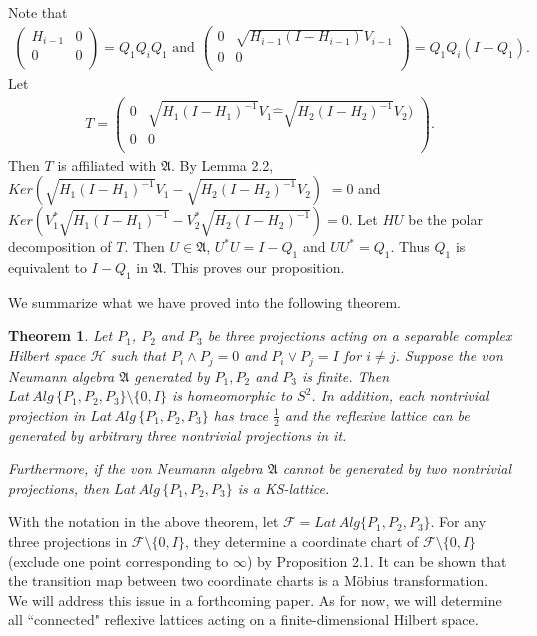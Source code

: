 \documentclass[12pt]{article}
\newtheorem{theorem}{Theorem}[section]
\newcommand{\AAA}{\mathfrak A} \newcommand{\TTT}{\mathfrak T}
\newcommand{\HHH}{\mathcal H} %
\newcommand{\FFF}{\mathcal F}
\begin{document}
{Note that
\begin{align*} \left(
  \begin{array}{cc}
    H_{i-1} &  0\\
    0 & 0 \\
  \end{array}
\right)=Q_1Q_iQ_1 \mbox{ and }
\left(
  \begin{array}{cc}
    0 &  \sqrt{H_{i-1}(I-H_{i-1})}V_{i-1}\\
    0 & 0 \\
  \end{array}
\right)=Q_1Q_i(I-Q_1).
\end{align*}
Let
\begin{align*}
T = \left(
  \begin{array}{cc}
    0 &  \sqrt{H_1(I-H_1)^{-1}}V_1 \widehat{-}\sqrt{H_2(I-H_2)^{-1}}V_2)\\
    0 & 0 \\
  \end{array}
\right).
\end{align*}
Then $T$ is affiliated with $\AAA$. By Lemma 2.2,
$Ker(\sqrt{H_1(I-H_1)^{-1}}V_1-\sqrt{H_2(I-H_2)^{-1}}V_2)$ $=0$ and
$Ker(V_1^*\sqrt{H_1(I-H_1)^{-1}}-V_2^*\sqrt{H_2(I-H_2)^{-1}})=0$.
Let $HU$ be the polar decomposition of $T$. Then $U\in \AAA$, $U^*U
= I-Q_1$ and $UU^{*} = Q_1$. Thus $Q_1$ is equivalent to $I- Q_1$ in
$\AAA$. This proves our proposition. \vspace{2mm}

We summarize what we have proved into the following theorem.

\begin{theorem} Let $P_1$, $P_2$ and $P_3$ be three projections acting on a separable complex Hilbert space $\HHH$ such that
$P_i \wedge P_j = 0$ and $P_i \vee P_j = I$ for $i \neq j$. Suppose
the von Neumann algebra $\AAA$ generated by $P_1, P_2$ and $P_3$ is
finite. Then $Lat\,Alg\,\{P_1,P_2,P_3\}\setminus \{0, I \}$ is
homeomorphic to $S^{2}$. In addition, each nontrivial projection in
$Lat\,Alg\,\{P_1,P_2,P_3\}$ has trace $\frac 12$ and the reflexive
lattice can be generated by arbitrary three nontrivial projections
in it.

Furthermore, if the von Neumann algebra $\AAA$ cannot be generated
by two nontrivial projections, then $Lat\,Alg\,\{P_1,P_2,P_3\}$ is a
KS-lattice.
\end{theorem}

With the notation in the above theorem, let $\FFF =
Lat\,Alg\{P_1,P_2,P_3\}$. For any three projections in $\FFF
\setminus \{0,I\} $, they determine a coordinate chart of $\FFF
\setminus \{0,I\} $ (exclude one point corresponding to $\infty$) by
Proposition 2.1. It can be shown that the transition map between two
coordinate charts is a M\"{o}bius  transformation. We will address
this issue in a forthcoming paper. As for now, we will determine all
``connected" reflexive lattices acting on a finite-dimensional
Hilbert space.


}
\end{document}
